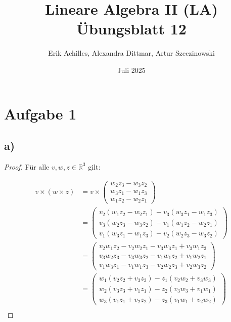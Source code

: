 \documentclass{article}
\title{Lineare Algebra II (LA) Übungsblatt 12}
\author{Erik Achilles, Alexandra Dittmar, Artur Szeczinowski}
\date{Juli 2025}
\newcommand{\RR}{\mathbb{R}}
\begin{document}
\maketitle

\section*{Aufgabe 1}

 \subsection*{a)}
 \begin{proof}
    Für alle $v, w, z \in \RR^3$ gilt:

    \[
    \begin{aligned}
        v \times (w \times z)
        &=
        v \times
        \begin{pmatrix}
            w_2 z_3 - w_3 z_2 \\
            w_3 z_1 - w_1 z_3 \\
            w_1 z_2 - w_2 z_1
        \end{pmatrix}\\
        &=
        \begin{pmatrix}
            v_2 (w_1 z_2 - w_2 z_1) - v_3 (w_3 z_1 - w_1 z_3) \\
            v_3 (w_2 z_3 - w_3 z_2) - v_1 (w_1 z_2 - w_2 z_1) \\
            v_1 (w_3 z_1 - w_1 z_3) - v_2 (w_2 z_3 - w_3 z_2)
        \end{pmatrix} \\
        &=
        \begin{pmatrix}
            v_2 w_1 z_2 - v_2 w_2 z_1 - v_3 w_3 z_1 + v_3 w_1 z_3 \\
            v_3 w_2 z_3 - v_3 w_3 z_2 - v_1 w_1 z_2 + v_1 w_2 z_1 \\
            v_1 w_3 z_1 - v_1 w_1 z_3 - v_2 w_2 z_3 + v_2 w_3 z_2
        \end{pmatrix} \\
        &=
        \begin{pmatrix}
            w_1(v_2  z_2 + v_3  z_3) - z_1(v_2 w_2  + v_3 w_3 )  \\
            w_2(v_3  z_3 + v_1  z_1) - z_2(v_3 w_3  + v_1 w_1 )  \\
            w_3(v_1  z_1 + v_2  z_2) - z_3(v_1 w_1  + v_2 w_2 ) 
        \end{pmatrix} \\

\end{aligned}\]
\end{proof}
\end{document}
